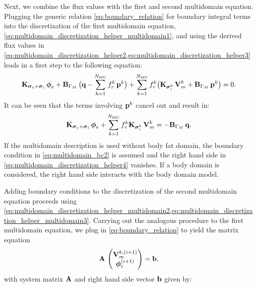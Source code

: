 Next, we combine the flux values with the first and second multidomain equation.
Plugging the generic relation \cref{eq:boundary_relation} for boundary integral terms into the discretization of the first multidomain equation, \cref{eq:multidomain_discretization_helper_multidomain1}, and using the derived flux values in \cref{eq:multidomain_discretization_helper2,eq:multidomain_discretization_helper3} leads in a first step to the following equation:
\begin{align*}
  \textbf{K}_{\boldsymbol{\sigma}_e + \boldsymbol{\sigma}_i}\,\boldsymbol{\phi}_{e} + \textbf{B}_{\Gamma_M}\,\big(\textbf{q} - \displaystyle\sum\limits_{k=1}^{N_\text{MU}} f_r^k\,\textbf{p}^k\big) +  \displaystyle\sum\limits_{k=1}^{N_\text{MU}} f_r^k \big(\textbf{K}_{\boldsymbol{\sigma}_i^k}\,\textbf{V}_m^k + \textbf{B}_{\Gamma_M}\,\textbf{p}^k\big) = 0.  
\end{align*}
It can be seen that the terms involving $\textbf{p}^k$ cancel out and result in:
\begin{align}\label{eq:multidomain_discretization_helper4}
    \textbf{K}_{\boldsymbol{\sigma}_e + \boldsymbol{\sigma}_i}\,\boldsymbol{\phi}_{e} + \displaystyle\sum\limits_{k=1}^{N_\text{MU}} f_r^k \textbf{K}_{\boldsymbol{\sigma}_i^k}\,\textbf{V}_m^k = -\textbf{B}_{\Gamma_M}\,\textbf{q}.
\end{align}
%
If the multidomain description is used without body fat domain, the boundary condition in \cref{eq:multidomain_bc2} is assumed and the right hand side in \cref{eq:multidomain_discretization_helper4} vanishes. If a body domain is considered, the right hand side interacts with the body domain model.

Adding boundary conditions to the discretization of the second multidomain equation proceeds using \cref{eq:multidomain_discretization_helper_multidomain2,eq:multidomain_discretization_helper_multidomain3}.
Carrying out the analogous procedure to the first multidomain equation, we plug in \cref{eq:boundary_relation} to yield the matrix equation
\begin{align}\label{eq:multidomain_discretization1}
  \textbf{A}\,\left(\begin{matrix}\textbf{V}_m^{k,(i+1)}\\ \boldsymbol{\phi}_{e}^{(i+1)}\end{matrix}\right) = \textbf{b},
\end{align}
%
with system matrix $\textbf{A}$ and right hand side vector $\textbf{b}$ given by:%

